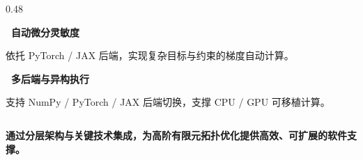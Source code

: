 \documentclass[notheorems]{beamer}
\begin{document}
\begin{frame}
\begin{columns}[t, totalwidth=\linewidth]
\begin{column}{0.48\linewidth}
\begin{tcolorbox}
{						\par\vspace{4pt}
						\textbf{~自动微分灵敏度}\par
						\vspace{2pt}
						依托 PyTorch / JAX 后端，实现复杂目标与约束的梯度自动计算。
						
						\par\vspace{4pt}
						\textbf{~多后端与异构执行}\par
						\vspace{2pt}
						支持 NumPy / PyTorch / JAX 后端切换，支撑 CPU / GPU 可移植计算。
					}
				\end{tcolorbox}
			\end{column}
			
		\end{columns}
		
		\vspace{0.4em}
		
		\begin{tcolorbox}[
			colback=structure.fg, colframe=structure.fg,
			coltext=white, boxrule=0pt, arc=2pt,
			top=4pt, bottom=4pt, left=8pt, right=8pt,
			]
			\centering\fontsize{8}{11}\selectfont\sffamily\bfseries
			通过分层架构与关键技术集成，为高阶有限元拓扑优化提供高效、可扩展的软件支撑。
		\end{tcolorbox}
		
	\end{frame}
	
\end{document}
